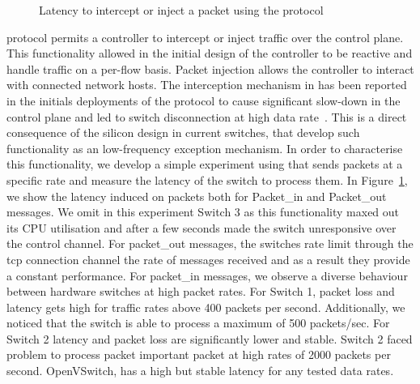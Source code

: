 \begin{figure}[ht]
  \begin{center}
  \end{center}
  \caption{Latency to intercept or inject a packet using the \of protocol}
  \label{fig:pkt_in_out_delay}
\end{figure}

\of protocol permits a controller to intercept or inject traffic over the
control plane. This functionality allowed in the initial design of the \of
controller to be reactive and handle traffic on a per-flow basis. Packet
injection allows the controller to interact with connected network hosts. The
interception mechanism in \of has been reported in the initials deployments of
the protocol to cause significant slow-down in the control plane and led to
switch disconnection at high data rate~\cite{Kobayashi:vn}. This is a direct
consequence of the silicon design in current \of switches, that develop such
functionality as an low-frequency exception mechanism. In order to characterise
this functionality, we develop a simple experiment using \oflops that sends
packets at a specific rate and measure the latency of the switch to process
them. In Figure~\ref{fig:pkt_in_out_delay}, we show the latency induced on
packets both for Packet\_in and Packet\_out messages. We omit in this experiment
Switch 3 as this functionality maxed out its CPU utilisation and after a few seconds
made the switch unresponsive over the control channel. For packet\_out messages,
the switches rate limit through the tcp connection channel the rate of messages
received and as a result they provide a constant performance. For packet\_in
messages, we observe a diverse behaviour between hardware switches at high
packet rates. For Switch 1, packet loss and latency gets high for traffic rates 
above 400 packets per second. Additionally, we noticed that the switch is able to 
process a maximum of 500 packets/sec. For Switch 2 latency and packet loss are 
significantly lower and stable. Switch 2 faced problem to process packet  
important packet at high rates of 2000 packets per second. OpenVSwitch, has a high 
but stable latency for any tested data rates. 

